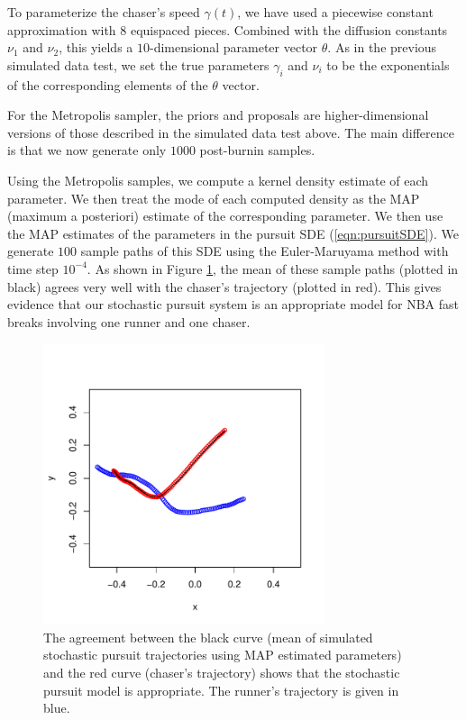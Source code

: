 \documentclass[graybox]{svmult}
\begin{document}
To parameterize the chaser's speed $\gamma(t)$, we have used a
piecewise constant approximation with $8$ equispaced pieces.  Combined
with the diffusion constants $\nu_1$ and $\nu_2$, this yields a
$10$-dimensional parameter vector $\theta$.  As in the previous
simulated data test, we set the true parameters $\gamma_i$ and $\nu_i$ to
be the exponentials of the corresponding elements of the $\theta$
vector.

For the Metropolis sampler, the priors and proposals are
higher-dimensional versions of those described in the simulated data
test above.  The main difference is that we now generate only $1000$
post-burnin samples. 

Using the Metropolis samples, we compute a kernel density estimate of
each parameter.  We then treat the mode of each computed density as
the MAP (maximum a posteriori) estimate of the corresponding
parameter.  We then use the MAP estimates of the parameters in the
pursuit SDE (\ref{eqn:pursuitSDE}).  We generate $100$ sample paths of
this SDE using the Euler-Maruyama method with time step $10^{-4}$.  As
shown in Figure \ref{fig:nbaspatial}, the mean of these sample paths
(plotted in black) agrees very well with the chaser's trajectory
(plotted in red).  This gives evidence that our stochastic pursuit
system is an appropriate model for NBA fast breaks involving one
runner and one chaser.

\begin{figure}
\vspace{-0.6in}
\begin{center}
\includegraphics[width=3.25in]{nbaspatial}
\end{center}
\vspace{-0.25in}
\caption{The agreement between the black curve (mean of simulated
  stochastic pursuit trajectories using MAP estimated parameters) and
  the red curve (chaser's trajectory) shows that the stochastic
  pursuit model is appropriate.  The runner's trajectory is given in blue.}
\label{fig:nbaspatial}
\end{figure}
\end{document}
